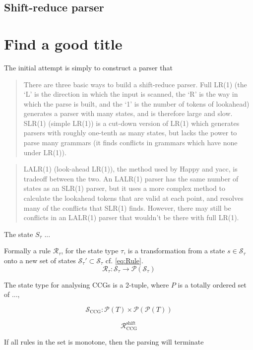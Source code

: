 \subsection{Shift-reduce parser}
\section{Find a good title}
The initial attempt is simply to construct a parser that 

\begin{quote}
	There are three basic ways to build a shift-reduce parser. Full LR(1) (the `L' is the direction in which the input is scanned, the `R' is the way in which the parse is built, and the `1' is the number of tokens of lookahead) generates a parser with many states, and is therefore large and slow. SLR(1) (simple LR(1)) is a cut-down version of LR(1) which generates parsers with roughly one-tenth as many states, but lacks the power to parse many grammars (it finds conflicts in grammars which have none under LR(1)).
\end{quote}

\begin{quote}
LALR(1) (look-ahead LR(1)), the method used by Happy and yacc, is tradeoff between the two. An LALR(1) parser has the same number of states as an SLR(1) parser, but it uses a more complex method to calculate the lookahead tokens that are valid at each point, and resolves many of the conflicts that SLR(1) finds. However, there may still be conflicts in an LALR(1) parser that wouldn't be there with full LR(1).
\end{quote}

The state $S_\tau$ ...

Formally a rule $\mathcal{R}_\tau$, for the state type $\tau$, is a transformation from a state $s \in \mathcal{S}_\tau$ onto a new set of states $\mathcal{S}_\tau' \subset \mathcal{S}_\tau$ cf. \ref{eq:Rule}.
\begin{equation}
	\mathcal{R}_\tau : \mathcal{S}_\tau \to \mathcal{P}(\mathcal{S}_\tau)
	\label{eq:Rule}
\end{equation} 

The state type for analysing CCGs is a 2-tuple, where $P$ is  a totally ordered set of ..., 

$$\mathcal{S}_\mathrm{CCG} : \mathcal{P}(T) \times \mathcal{P}(\mathcal{P}(T))$$

\begin{equation}
	\mathcal{R}^\mathrm{shift}_\mathrm{CCG}
\end{equation}

If all rules in the set is monotone, then the parsing will terminate 


